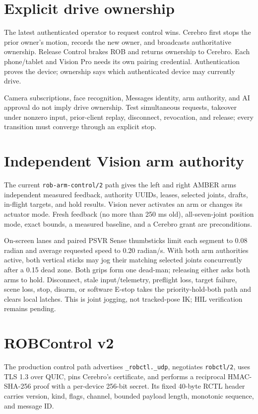 \documentclass[10pt,openany]{book}
\begin{document}
\section{Explicit drive ownership}

\Implemented\quad The latest authenticated operator to request control wins. Cerebro first stops the prior owner's motion, records the new owner, and broadcasts authoritative ownership. Release Control brakes ROB and returns ownership to Cerebro. Each phone/tablet and Vision Pro needs its own pairing credential. Authentication proves the device; ownership says which authenticated device may currently drive.

Camera subscriptions, face recognition, Messages identity, arm authority, and AI approval do not imply drive ownership. Test simultaneous requests, takeover under nonzero input, prior-client replay, disconnect, revocation, and release; every transition must converge through an explicit stop.

\section{Independent Vision arm authority}

\Experimental\quad The current \texttt{rob-arm-control/2} path gives the left and right AMBER arms independent measured feedback, authority UUIDs, leases, selected joints, drafts, in-flight targets, and hold results. Vision never activates an arm or changes its actuator mode. Fresh feedback (no more than 250 ms old), all-seven-joint position mode, exact bounds, a measured baseline, and a Cerebro grant are preconditions.

On-screen lanes and paired PSVR Sense thumbsticks limit each segment to 0.08 radian and average requested speed to 0.20 radian/s. With both arm authorities active, both vertical sticks may jog their matching selected joints concurrently after a 0.15 dead zone. Both grips form one dead-man; releasing either asks both arms to hold. Disconnect, stale input/telemetry, preflight loss, target failure, scene loss, stop, disarm, or software E-stop takes the priority-hold-both path and clears local latches. This is joint jogging, not tracked-pose IK; HIL verification remains pending.

\section{ROBControl v2}

\Implemented\quad The production control path advertises \texttt{\_robctl.\_udp}, negotiates \texttt{robctl/2}, uses TLS 1.3 over QUIC, pins Cerebro's certificate, and performs a reciprocal HMAC-SHA-256 proof with a per-device 256-bit secret. Its fixed 40-byte RCTL header carries version, kind, flags, channel, bounded payload length, monotonic sequence, and message ID.
\end{document}
